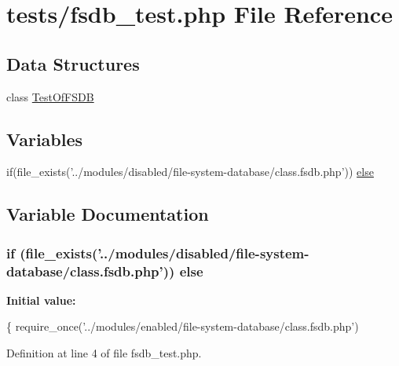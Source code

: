 \hypertarget{fsdb__test_8php}{\section{tests/fsdb\-\_\-test.php File Reference}
\label{fsdb__test_8php}
}
\subsection*{Data Structures}
\begin{DoxyCompactItemize}
\item 
class \hyperlink{class_test_of_f_s_d_b}{Test\-Of\-F\-S\-D\-B}
\end{DoxyCompactItemize}
\subsection*{Variables}
\begin{DoxyCompactItemize}
\item 
if(file\-\_\-exists('../modules/disabled/file-\/system-\/database/class.\-fsdb.\-php')) \hyperlink{fsdb__test_8php_af0d634126fd02728cfa711b6bc675931}{else}
\end{DoxyCompactItemize}


\subsection{Variable Documentation}
\hypertarget{fsdb__test_8php_af0d634126fd02728cfa711b6bc675931}{
\subsubsection[{else}]{\setlength{\rightskip}{0pt plus 5cm}if (file\-\_\-exists('../modules/disabled/file-\/system-\/database/class.\-fsdb.\-php')) else}}\label{fsdb__test_8php_af0d634126fd02728cfa711b6bc675931}
{\bfseries Initial value\-:}
\begin{DoxyCode}
\{
        require\_once(\textcolor{stringliteral}{'../modules/enabled/file-system-database/class.fsdb.php'})
\end{DoxyCode}


Definition at line 4 of file fsdb\-\_\-test.\-php.

